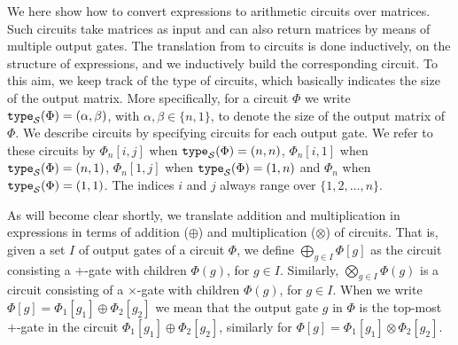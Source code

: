 We here show how to convert \langfor expressions to arithmetic circuits over matrices.
Such circuits take matrices as input and can also return matrices by means of multiple
output gates. The translation from \langfor to circuits is done inductively, on the structure
of \langfor expressions, and we inductively build the corresponding circuit. To this aim, we keep track of
the type of circuits, which basically indicates the size of the output matrix. More specifically,
for a circuit $\Phi$ we write $\texttt{type}_{\mathcal{S}}(\Phi)=(\alpha,\beta)$, with $\alpha,\beta\in \{n,1\}$, to denote the size of 
the output matrix of $\Phi$. 
%
%
We describe circuits by specifying circuits for each output gate. We refer to
these circuits by $\Phi_{n}[i,j]$ when $\texttt{type}_{\mathcal{S}}(\Phi)=(n,n)$, 
$\Phi_{n}[i,1]$ when $\texttt{type}_{\mathcal{S}}(\Phi)=(n,1)$, $\Phi_{n}[1,j]$ when $\texttt{type}_{\mathcal{S}}(\Phi)=(1,n)$ and 
$\Phi_{n}$ when $\texttt{type}_{\mathcal{S}}(\Phi)=(1,1)$. The indices $i$ and $j$ always range over $\{1,2,\ldots,n\}$.


As will become clear shortly, we translate addition and multiplication in \langfor
expressions in terms of addition ($\oplus$) and multiplication ($\otimes$) of circuits.
That is, given a set $I$ of output gates of a circuit $\Phi$, we define 
$\bigoplus_{g\in I} \Phi[g]$ as the circuit consisting a $+$-gate with children
$\Phi(g)$, for $g\in I$. Similarly, $\bigotimes_{g\in I} \Phi(g)$ is a circuit
consisting of a $\times$-gate with children $\Phi(g)$, for $g\in I$. When 
we write $\Phi[g]=\Phi_1[g_1]\oplus \Phi_2[g_2]$ we mean that the output gate
$g$ in $\Phi$ is the top-most $+$-gate in the circuit $\Phi_1[g_1]\oplus \Phi_2[g_2]$,
similarly for $\Phi[g]=\Phi_1[g_1]\otimes \Phi_2[g_2]$.


